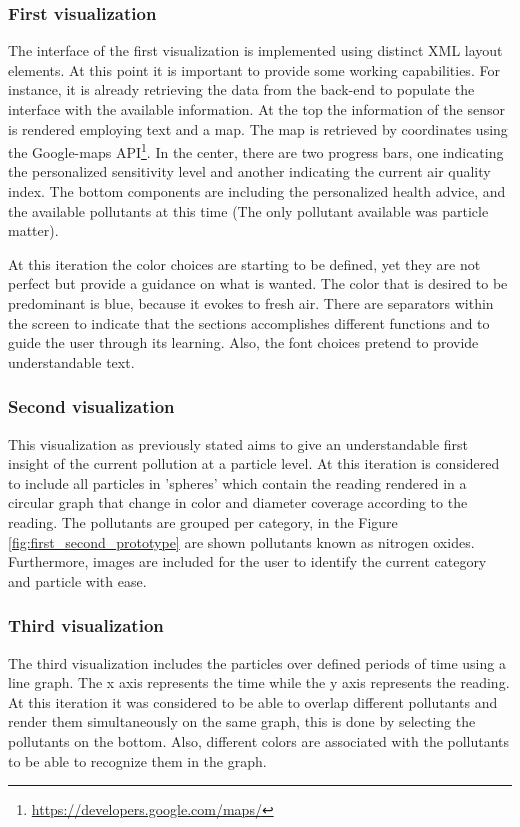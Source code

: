 \subsubsection{First visualization}
The interface of the first visualization is implemented using distinct XML layout elements. At this point it is important to provide some working capabilities. For instance, it is already retrieving the data from the back-end to populate the interface with the available information. At the top the information of the sensor is rendered employing text and a map. The map is retrieved by coordinates using the Google-maps API\footnote{\url{https://developers.google.com/maps/}}. In the center, there are two progress bars, one indicating the personalized sensitivity level and another indicating the current air quality index. The bottom components are including the personalized health advice, and the available pollutants at this time (The only pollutant available was particle matter). 

At this iteration the color choices are starting to be defined, yet they are not perfect but provide a guidance on what is wanted. The color that is desired to be predominant is blue, because it evokes to fresh air. There are separators within the screen to indicate that the sections accomplishes different functions and to guide the user through its learning. Also, the font choices pretend to provide understandable text. 

\subsubsection{Second visualization}
This visualization as previously stated aims to give an understandable first insight of the current pollution at a particle level. At this iteration is considered to include all particles in 'spheres' which contain the reading rendered in a circular graph that change in color and diameter coverage according to the reading. The pollutants are grouped per category, in the Figure \ref{fig:first_second_prototype} are shown pollutants known as nitrogen oxides. Furthermore, images are included for the user to identify the current category and particle with ease.

\subsubsection{Third visualization}
The third visualization includes the particles over defined periods of time using a line graph. The x axis represents the time while the y axis represents the reading. At this iteration it was considered to be able to overlap different pollutants and render them simultaneously on the same graph, this is done by selecting the pollutants on the bottom. Also, different colors are associated with the pollutants to be able to recognize them in the graph.

